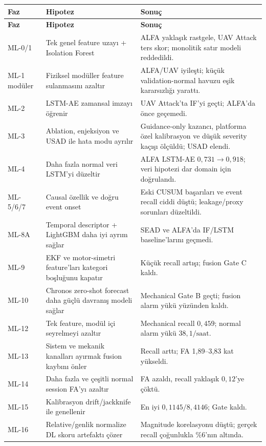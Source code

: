 \documentclass[11pt,a4paper,oneside]{report}
\begin{document}
\begin{longtable}{L{0.12\textwidth}L{0.31\textwidth}L{0.47\textwidth}}
\toprule
\textbf{Faz} & \textbf{Hipotez} & \textbf{Sonuç}\\
\midrule
\endfirsthead
\toprule
\textbf{Faz} & \textbf{Hipotez} & \textbf{Sonuç}\\
\midrule
\endhead
ML-0/1 & Tek genel feature uzayı + Isolation Forest & ALFA yaklaşık rastgele, UAV Attack ters skor; monolitik satır modeli reddedildi.\\
ML-1 modüler & Fiziksel modüller feature sulanmasını azaltır & ALFA/UAV iyileşti; küçük validation-normal havuzu eşik kararsızlığı yarattı.\\
ML-2 & LSTM-AE zamansal imzayı öğrenir & UAV Attack'ta IF'yi geçti; ALFA'da önce geçemedi.\\
ML-3 & Ablation, enjeksiyon ve USAD ile hata modu ayrılır & Guidance-only kazancı, platforma özel kalibrasyon ve düşük severity kaçışı ölçüldü; USAD elendi.\\
ML-4 & Daha fazla normal veri LSTM'yi düzeltir & ALFA LSTM-AE \(0{,}731\to0{,}918\); veri hipotezi dar domain için doğrulandı.\\
ML-5/6/7 & Causal özellik ve doğru event onset & Eski CUSUM başarıları ve event recall ciddi düştü; leakage/proxy sorunları düzeltildi.\\
ML-8A & Temporal descriptor + LightGBM daha iyi ayrım sağlar & SEAD ve ALFA'da IF/LSTM baseline'larını geçmedi.\\
ML-9 & EKF ve motor-simetri feature'ları kategori boşluğunu kapatır & Küçük recall artışı; fusion Gate C kaldı.\\
ML-10 & Chronos zero-shot forecast daha güçlü davranış modeli sağlar & Mechanical Gate B geçti; fusion alarm yükü yüzünden kaldı.\\
ML-12 & Tek feature, modül içi seyrelmeyi azaltır & Mechanical recall \(0{,}459\); normal alarm yükü \(38{,}1/\text{saat}\).\\
ML-13 & Sistem ve mekanik kanalları ayırmak fusion kaybını önler & Recall arttı; FA 1,89--3,83 kat yükseldi.\\
ML-14 & Daha fazla ve çeşitli normal session FA'yı azaltır & FA azaldı, recall yaklaşık \(0{,}12\)'ye çöktü.\\
ML-15 & Kalibrasyon drift/jackknife ile genellenir & En iyi \(0{,}1145/8{,}4146\); Gate kaldı.\\
ML-16 & Relative/genlik normalize DL skoru artefaktı çözer & Magnitude korelasyonu düştü; gerçek recall çoğunlukla \(\%6\)'nın altında.\\

\end{longtable}
\end{document}
